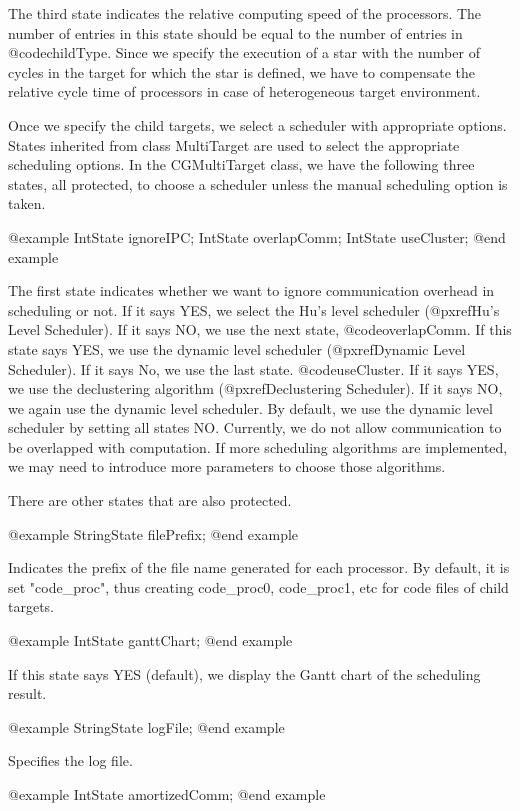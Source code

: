 The third state indicates the relative computing speed of the processors.
The number of entries in this state should be equal to the number of
entries in @code{childType}. Since we specify the execution of a star
with the number of cycles in the target for which the star is defined,
we have to compensate the relative cycle time of processors in case of
heterogeneous target environment.

Once we specify the child targets, we select a scheduler with appropriate
options. States inherited from class MultiTarget are used to select
the appropriate scheduling options. In the CGMultiTarget class, we have
the following three states, all protected, to choose a scheduler unless
the manual scheduling option is taken.

@example
IntState ignoreIPC;
IntState overlapComm;
IntState useCluster;
@end example

The first state indicates whether we want to ignore communication overhead
in scheduling or not. If it says YES, we select the Hu's level scheduler
(@pxref{Hu's Level Scheduler}). If it says NO, we use the next state,
@code{overlapComm}. If this state says YES, we use the dynamic level scheduler
(@pxref{Dynamic Level Scheduler}). If it says No, we use the last state.
@code{useCluster}. If it says YES, we use the declustering algorithm
(@pxref{Declustering Scheduler}). If it says NO, we again use the dynamic
level scheduler. By default, we use the dynamic level scheduler by setting
all states NO. Currently, we do not allow communication to be overlapped
with computation. If more scheduling algorithms are implemented, we may need
to introduce more parameters to choose those algorithms. 

There are other states that are also protected.

@example
StringState filePrefix;
@end example

Indicates the prefix of the file name generated for each processor.
By default, it is set "code_proc", thus creating code_proc0, code_proc1, etc
for code files of child targets.

@example
IntState ganttChart;
@end example

If this state says YES (default), we display the Gantt chart of the 
scheduling result. 

@example
StringState logFile;
@end example

Specifies the log file.

@example
IntState amortizedComm;
@end example

